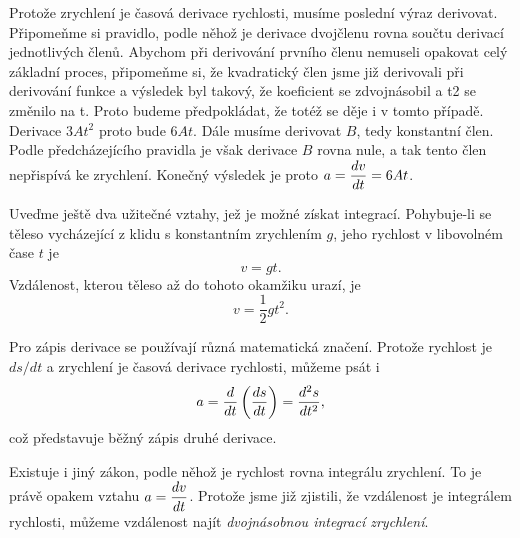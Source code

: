    Protože zrychlení je časová derivace rychlosti, musíme poslední výraz derivovat. Připomeňme si 
    pravidlo, podle něhož je derivace dvojčlenu rovna součtu derivací jednotlivých členů. Abychom 
    při derivování prvního členu nemuseli opakovat celý základní proces, připomeňme si, že 
    kvadratický člen jsme již derivovali při derivování funkce a výsledek byl takový, že koeficient 
    se zdvojnásobil a t2 se změnilo na t. Proto budeme předpokládat, že totéž se děje i v tomto 
    případě. Derivace \(3At^2\) proto bude \(6At\). Dále musíme derivovat \(B\), tedy konstantní 
    člen. Podle předcházejícího pravidla je však derivace \(B\) rovna nule, a tak tento člen 
    nepřispívá ke zrychlení. Konečný výsledek je proto \(a=\dfrac{d v}{d t}= 6At\).
    
    Uveďme ještě dva užitečné vztahy, jež je možné získat integrací. Pohybuje-li se těleso 
    vycházející z klidu s konstantním zrychlením \(g\), jeho rychlost v libovolném čase \(t\) je
    \begin{equation}\label{fyz:eq103}
      v = gt.
    \end{equation}
    Vzdálenost, kterou těleso až do tohoto okamžiku urazí, je
    \begin{equation}\label{fyz:eq104}
      v = \frac{1}{2}gt^2.
    \end{equation}
    
    Pro zápis derivace se používají různá matematická značení. Protože rychlost je \(ds/dt\) a 
    zrychlení je časová derivace rychlosti, můžeme psát i
    \begin{equation}\label{fyz:eq105}
      a = \dfrac{d  }{d t}\left(\dfrac{d s}{d t}\right) = \dfrac{d^2 s}{d t^2},
    \end{equation}
    což představuje běžný zápis druhé derivace.
    
    Existuje i jiný zákon, podle něhož je rychlost rovna integrálu zrychlení. To je právě opakem 
    vztahu \(a = \dfrac{d v}{d t}\). Protože jsme již zjistili, že vzdálenost je integrálem rychlosti, 
    můžeme vzdálenost najít \emph{dvojnásobnou integrací zrychlení}.
    
